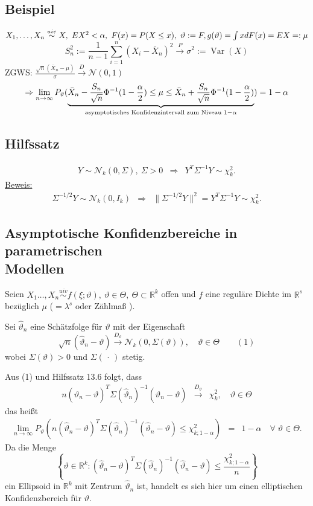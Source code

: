 \documentclass[a4paper,11pt,twoside,titlepage]{article}
\newcommand{\R}{{\mathbb R}}
\newcommand\NN{ \mathcal{N} } %
\newcommand{\uiv}{\ensuremath{\stackrel{uiv}{\sim}}}
\DeclareMathOperator{\var}{Var}
\begin{document}
\subsection{Beispiel}%
$X_1,\ldots,X_n\uiv X,\ EX^2<\alpha,\ F(x)=P(X\leq x),\ \vartheta:=F,\\
g(\vartheta)=\int xdF(x)=EX=:\mu$
\[S_n^2:=\frac{1}{n-1}\sum_{i=1}^n(X_i-\bar{X}_n)^2\stackrel{P}{\rightarrow}\sigma^2:=\var(X)\]
ZGWS: $\frac{\sqrt{n}(\bar{X}_n-\mu)}{\sigma}\stackrel{D}{\rightarrow}\NN(0,1)$
\[\Rightarrow \lim_{n\to\infty}P_\vartheta(\underbrace{
\bar{X}_n-\frac{S_n}{\sqrt{n}}\Phi^{-1}(1-\frac{\alpha}{2})\leq\mu\leq\bar{X}_n+\frac{S_n}{\sqrt{n}}\Phi^{-1}(1-\frac{\alpha}{2})}_{
\textnormal{asymptotisches Konfidenzintervall zum Niveau }1-\alpha})=1-\alpha\]

\subsection{Hilfssatz}%
\begin{eqnarray*}
Y \sim \NN_k(0,\Sigma),~ \Sigma>0 &\Longrightarrow& Y^T \Sigma^{-1} Y \sim \chi^2_k.
\end{eqnarray*}
\underline{Beweis:}
\begin{eqnarray*}
  \Sigma^{-1/2} Y \sim \NN_k(0,I_k) &\Rightarrow&
   \|\Sigma^{-1/2} Y\|^2 = Y^T\Sigma^{-1} Y\sim \chi^2_k.
\end{eqnarray*}

\subsection{Asymptotische Konfidenzbereiche in parametrischen\\ Modellen}%
Seien $X_1\ldots,X_n\stackrel{uiv}{\sim} f(\xi;\vartheta),~\vartheta\in\Theta,~\Theta\subset\R^k$ offen
und $f$ eine reguläre Dichte im $\R^s$ bezüglich $\mu$ ($=\lambda^s$ oder Zählmaß ).

Sei $\hat{\vartheta}_n$ eine Schätzfolge für $\vartheta$ mit der Eigenschaft
\[
\sqrt{n}(\hat{\vartheta}_n-\vartheta)\stackrel{D_\vartheta}{\longrightarrow}
\NN_k(0,\Sigma(\vartheta)),\quad \vartheta\in\Theta\qquad(1)\]
wobei $\Sigma(\vartheta)>0$ und $\Sigma(\, \cdot \,)$ stetig.

Aus (1) und Hilfssatz 13.6 folgt, dass
\begin{eqnarray*}
 n(\hat{\vartheta}_n-\vartheta)^T \Sigma(\hat{\vartheta}_n)^{-1} (\hat{\vartheta}_n-\vartheta)
  &\stackrel{D_\vartheta}{\longrightarrow}& \chi^2_k,\quad \vartheta\in\Theta
\end{eqnarray*}
das heißt
\begin{eqnarray*}
 \lim_{n\rightarrow\infty} P_\vartheta\left( n(\hat{\vartheta}_n-\vartheta)^T \Sigma
 (\hat{\vartheta}_n)^{-1} (\hat{\vartheta}_n-\vartheta)\leq \chi^2_{k;1-\alpha}\right)
 &=& 1-\alpha\quad \forall \; \vartheta \in\Theta.
\end{eqnarray*}
Da die Menge
$$\left\{\vartheta\in\R^k: (\hat{\vartheta}_n-\vartheta)^T\Sigma(\hat{\vartheta}_n)^{-1}
  (\hat{\vartheta}_n-\vartheta)\leq \frac{\chi^2_{k;1-\alpha}}{n} \right\}$$
ein Ellipsoid in $\R^k$ mit Zentrum $\hat{\vartheta}_n$ ist, handelt es sich hier um
einen elliptischen Konfidenzbereich f\"ur $\vartheta.$
\end{document}
